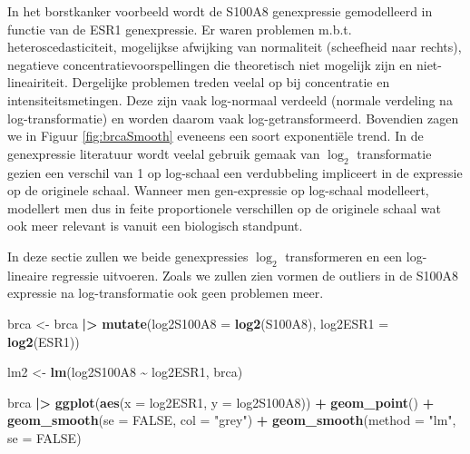 \documentclass[
  12pt,dutch]{book}
\newenvironment{Shaded}{\begin{snugshade}}{\end{snugshade}}
\newcommand{\AttributeTok}[1]{\textcolor[rgb]{0.13,0.29,0.53}{#1}}
\newcommand{\ConstantTok}[1]{\textcolor[rgb]{0.56,0.35,0.01}{#1}}
\newcommand{\FunctionTok}[1]{\textcolor[rgb]{0.13,0.29,0.53}{\textbf{#1}}}
\newcommand{\NormalTok}[1]{#1}
\newcommand{\OtherTok}[1]{\textcolor[rgb]{0.56,0.35,0.01}{#1}}
\newcommand{\SpecialCharTok}[1]{\textcolor[rgb]{0.81,0.36,0.00}{\textbf{#1}}}
\newcommand{\StringTok}[1]{\textcolor[rgb]{0.31,0.60,0.02}{#1}}
\theoremstyle{definition}
\theoremstyle{definition}
\theoremstyle{definition}
\theoremstyle{definition}
\theoremstyle{remark}
\begin{document}
In het borstkanker voorbeeld wordt de S100A8 genexpressie gemodelleerd in functie van de ESR1 genexpressie. Er waren problemen m.b.t. heteroscedasticiteit, mogelijkse afwijking van normaliteit (scheefheid naar rechts), negatieve concentratievoorspellingen die theoretisch niet mogelijk zijn en niet-lineairiteit. Dergelijke problemen treden veelal op bij concentratie en intensiteitsmetingen. Deze zijn vaak log-normaal verdeeld (normale verdeling na log-transformatie) en worden daarom vaak log-getransformeerd.
Bovendien zagen we in Figuur \ref{fig:brcaSmooth} eveneens een soort exponentiële trend.
In de genexpressie literatuur wordt veelal gebruik gemaak van \(\log_2\) transformatie gezien een verschil van 1 op log-schaal een verdubbeling impliceert in de expressie op de originele schaal.
Wanneer men gen-expressie op log-schaal modelleert, modellert men dus in feite proportionele verschillen op de originele schaal wat ook meer relevant is vanuit een biologisch standpunt.

In deze sectie zullen we beide genexpressies \(\log_2\) transformeren en een log-lineaire regressie uitvoeren. Zoals we zullen zien vormen de outliers in de S100A8 expressie na log-transformatie ook geen problemen meer.

\begin{Shaded}
\begin{Highlighting}[]
\NormalTok{brca }\OtherTok{\textless{}{-}}\NormalTok{ brca }\SpecialCharTok{|\textgreater{}}
    \FunctionTok{mutate}\NormalTok{(}\AttributeTok{log2S100A8 =} \FunctionTok{log2}\NormalTok{(S100A8), }\AttributeTok{log2ESR1 =} \FunctionTok{log2}\NormalTok{(ESR1))}

\NormalTok{lm2 }\OtherTok{\textless{}{-}} \FunctionTok{lm}\NormalTok{(log2S100A8 }\SpecialCharTok{\textasciitilde{}}\NormalTok{ log2ESR1, brca)}

\NormalTok{brca }\SpecialCharTok{|\textgreater{}}
    \FunctionTok{ggplot}\NormalTok{(}\FunctionTok{aes}\NormalTok{(}\AttributeTok{x =}\NormalTok{ log2ESR1, }\AttributeTok{y =}\NormalTok{ log2S100A8)) }\SpecialCharTok{+} \FunctionTok{geom\_point}\NormalTok{() }\SpecialCharTok{+}
    \FunctionTok{geom\_smooth}\NormalTok{(}\AttributeTok{se =} \ConstantTok{FALSE}\NormalTok{, }\AttributeTok{col =} \StringTok{"grey"}\NormalTok{) }\SpecialCharTok{+} \FunctionTok{geom\_smooth}\NormalTok{(}\AttributeTok{method =} \StringTok{"lm"}\NormalTok{,}
    \AttributeTok{se =} \ConstantTok{FALSE}\NormalTok{)}
\end{Highlighting}
\end{Shaded}
\end{document}
